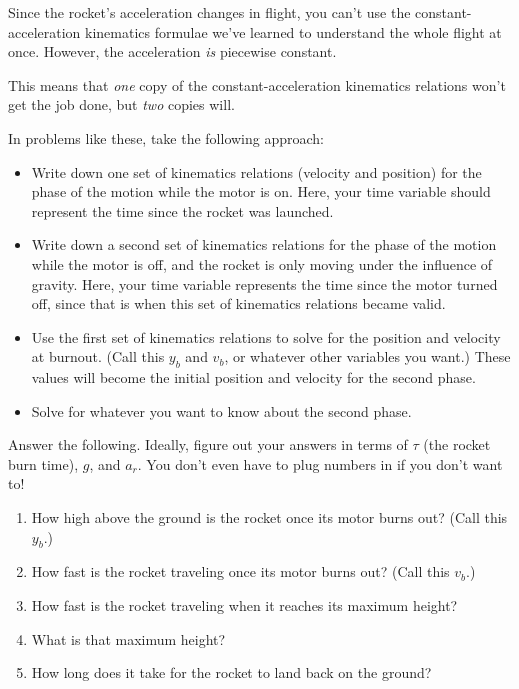 \documentclass[12pt]{article}
\newcommand{\BI}{\begin{itemize}}
\newcommand{\EI}{\end{itemize}}
\begin{document}
\newpage
Since the rocket's acceleration changes in flight, you can't use the constant-acceleration kinematics
formulae we've learned to understand the whole flight at once. However, the acceleration {\it is} piecewise constant.

This means that {\it one} copy of the constant-acceleration kinematics relations won't get the job done, but {\it two} 
copies will.

In problems like these, take the following approach:

\BI
\item Write down one set of kinematics relations (velocity and position) for the phase of the motion while the motor is on. Here, your time variable should represent the time since the rocket was launched. 
\item Write down a second set of kinematics relations for the phase of the motion while the motor is off, and the rocket is only moving under the influence of gravity. Here, your time variable represents the time since the motor turned off, since that is when this set of kinematics relations became valid.
\item Use the first set of kinematics relations to solve for the position and velocity at burnout. (Call this $y_b$ and $v_b$, or whatever other variables you want.) These values will become the initial position and velocity for the second phase. 
\item Solve for whatever you want to know about the second phase.
\EI

Answer the following. Ideally, figure out your answers in terms of $\tau$ (the rocket burn time), $g$, and $a_r$. You don't 
even have to plug numbers in if you don't want to!

\begin{enumerate}

\item How high above the ground is the rocket once its motor burns out? (Call this $y_b$.)
\vspace{2in}
\newpage
\item How fast is the rocket traveling once its motor burns out? (Call this $v_b$.)

\vspace{1.7in}
\item How fast is the rocket traveling when it reaches its maximum height?

\vspace{1.7in}
\item What is that maximum height?

\vspace{1.6in}
\item How long does it take for the rocket to land back on the ground?

\vspace{1.6in}
\end{enumerate}
\end{document}
